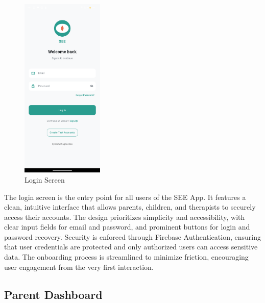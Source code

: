 ﻿\documentclass[12pt,a4paper]{article}
\newcommand{\sectiontitle}[1]{\subsection{#1}}
\begin{document}
\begin{figure}[H]
    \centering
    \includegraphics[width=0.35\textwidth]{Screenshots/Loginscreen.png}
    \caption{Login Screen}
    \label{fig:login-screen}
\end{figure}
The login screen is the entry point for all users of the SEE App. It features a clean, intuitive interface that allows parents, children, and therapists to securely access their accounts. The design prioritizes simplicity and accessibility, with clear input fields for email and password, and prominent buttons for login and password recovery. Security is enforced through Firebase Authentication, ensuring that user credentials are protected and only authorized users can access sensitive data. The onboarding process is streamlined to minimize friction, encouraging user engagement from the very first interaction.

\sectiontitle{Parent Dashboard}
\end{document}
